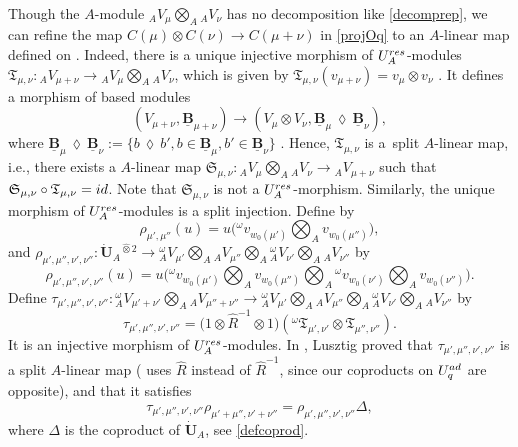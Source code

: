 \documentclass[11pt]{article}
\numberwithin{equation}{section}
\numberwithin{equation}{section}
\theoremstyle{definition}
\newcommand{\ra}{\rightarrow}
\newcommand{\smallbullet}{%
\vcenter{\hbox{\,\scalebox{0.5}{$\bullet$}\,}}
}
\begin{document}
Though the $A$-module ${}_AV_\mu \bigotimes_A {}_AV_\nu$ has no decomposition like \eqref{decomprep}, we can refine the map $C(\mu) \otimes C(\nu) \ra C(\mu+\nu)$ in \eqref{projOq} to an $A$-linear map defined on \smash{${}_A \overset{\raisebox{-1.5pt}{\scriptsize$\smallbullet$}}{C} (\mu) \bigotimes_A {}_A \overset{\raisebox{-1.5pt}{\scriptsize$\smallbullet$}}{C} (\nu)$}. Indeed, there is a unique injective morphism of $U_A^{\rm res}$-modules $\mathfrak{T}_{\mu,\nu}\colon{}_AV_{\mu+\nu}\ra {}_AV_\mu \bigotimes_A {}_AV_\nu$, which is given by $\mathfrak{T}_{\mu,\nu}(v_{\mu+\nu}) = v_{\mu} \otimes v_{\nu}$ \cite[Proposition 25.1.2\,(a)--(b)]{Lusztig}. It defines a morphism of based modules
\[(V_{\mu+\nu},\underline{\mathbf{B}}_{\mu+\nu}) \ra (V_\mu \otimes V_\nu ,\underline{\mathbf{B}}_{\mu} \,\lozenge\, \underline{\mathbf{B}}_\nu),
\]
where $\underline{\mathbf{B}}_{\mu} \,\lozenge\, \underline{\mathbf{B}}_\nu := \{b\,\lozenge\, b', b\in \underline{\mathbf{B}}_{\mu}, b'\in \underline{\mathbf{B}}_{\nu} \}$ \cite[Proposition~27.1.7]{Lusztig}. Hence, $\mathfrak{T}_{\mu,\nu}$ is a~split $A$-li\-near map, i.e., there exists a $A$-linear map $\mathfrak{S}_{\mu,\nu}\colon {}_AV_\mu \bigotimes_A {}_AV_\nu \ra {}_AV_{\mu+\nu} $ such that ${\mathfrak{S}_{\mu,\nu}\circ \mathfrak{T}_{\mu,\nu} ={\rm id}}$. Note that $\mathfrak{S}_{\mu,\nu}$ is not a $U_A^{\rm res}$-morphism. Similarly, the unique morphism of $U_A^{\rm res}$-modules \smash{${}^\omega\mathfrak{T}_{\mu,\nu}\colon{}_A^\omega V_{\mu+\nu}\ra {}_A^\omega V_\mu \bigotimes_A {}_A^\omega V_\nu$} is a split injection. Define \smash{$\rho_{\mu',\mu''}\colon \dot{\mathbf{U}}_A \ra {}_A^\omega V_{\mu'} \bigotimes_A {}_AV_{\mu''}$} by
\[
\rho_{\mu',\mu''}(u)= u\biggl({}^\omega v_{w_0(\mu')}\bigotimes_A v_{w_0(\mu'')}\biggr),\]
and $\rho_{\mu',\mu'',\nu',\nu''}\colon \dot{\mathbf{U}}_A{}^{ \hat{\otimes}2} \ra {}_A^\omega V_{\mu'} \bigotimes_A {}_AV_{\mu''} \bigotimes_A {}_A^\omega V_{\nu'} \bigotimes_A {}_AV_{\nu''}$ by
\[\rho_{\mu',\mu'',\nu',\nu''}(u)= u\biggl({}^\omega v_{w_0(\mu')}\bigotimes_A v_{w_0(\mu'')}\bigotimes_A {}^\omega v_{w_0(\nu')}\bigotimes_A v_{w_0(\nu'')}\biggr).\]
Define $\tau_{\mu',\mu'',\nu',\nu''}\colon {}_A^\omega V_{\mu'+\nu'} \bigotimes_A {}_AV_{\mu''+\nu''} \ra {}_A^\omega V_{\mu'} \bigotimes_A {}_AV_{\mu''} \bigotimes_A {}_A^\omega V_{\nu'} \bigotimes_A {}_AV_{\nu''}$ by
\[\tau_{\mu',\mu'',\nu',\nu''} = \big(1\otimes \hat{R}^{-1} \otimes 1\big)({}^\omega \mathfrak{T}_{\mu',\nu'} \otimes \mathfrak{T}_{\mu'',\nu''}).\]
It is an injective morphism of $U_A^{\rm res}$-modules. In \cite[Section 1.13]{Lusztig3}, Lusztig proved that $\tau_{\mu',\mu'',\nu',\nu''}$ is a split $A$-linear map (\cite{Lusztig3} uses $\hat{R}$ instead of $\hat{R}^{-1}$, since our coproducts on $U_q^{\rm ad}$ are opposite), and that it satisfies{\samepage
\begin{equation}\label{commutdiagLusztig}
\tau_{\mu',\mu'',\nu',\nu''} \rho_{\mu'+\mu'',\nu'+\nu''} = \rho_{\mu',\mu'',\nu',\nu''}\Delta,
\end{equation}
where $\Delta$ is the coproduct of $\dot{\mathbf{U}}_A$, see \eqref{defcoprod}.}
\end{document}
